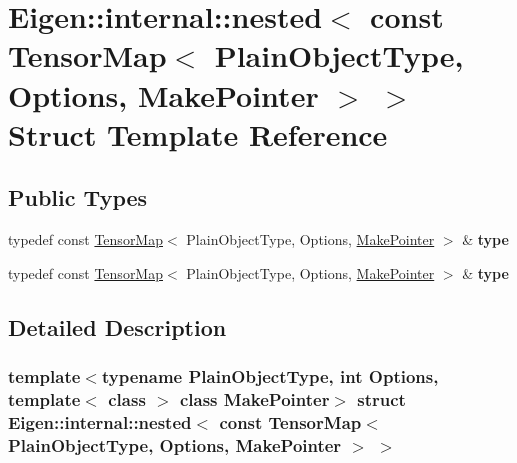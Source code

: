 \hypertarget{struct_eigen_1_1internal_1_1nested_3_01const_01_tensor_map_3_01_plain_object_type_00_01_options_00_01_make_pointer_01_4_01_4}{}\section{Eigen\+:\+:internal\+:\+:nested$<$ const Tensor\+Map$<$ Plain\+Object\+Type, Options, Make\+Pointer $>$ $>$ Struct Template Reference}
\label{struct_eigen_1_1internal_1_1nested_3_01const_01_tensor_map_3_01_plain_object_type_00_01_options_00_01_make_pointer_01_4_01_4}
\subsection*{Public Types}
\begin{DoxyCompactItemize}
\item 
\mbox{\label{struct_eigen_1_1internal_1_1nested_3_01const_01_tensor_map_3_01_plain_object_type_00_01_options_00_01_make_pointer_01_4_01_4_aed5a6f72f62f38006cb2ff3a37c3d5f2}} 
typedef const \hyperlink{class_eigen_1_1_tensor_map}{Tensor\+Map}$<$ Plain\+Object\+Type, Options, \hyperlink{struct_eigen_1_1_make_pointer}{Make\+Pointer} $>$ \& {\bfseries type}
\item 
\mbox{\label{struct_eigen_1_1internal_1_1nested_3_01const_01_tensor_map_3_01_plain_object_type_00_01_options_00_01_make_pointer_01_4_01_4_aed5a6f72f62f38006cb2ff3a37c3d5f2}} 
typedef const \hyperlink{class_eigen_1_1_tensor_map}{Tensor\+Map}$<$ Plain\+Object\+Type, Options, \hyperlink{struct_eigen_1_1_make_pointer}{Make\+Pointer} $>$ \& {\bfseries type}
\end{DoxyCompactItemize}


\subsection{Detailed Description}
\subsubsection*{template$<$typename Plain\+Object\+Type, int Options, template$<$ class $>$ class Make\+Pointer$>$\newline
struct Eigen\+::internal\+::nested$<$ const Tensor\+Map$<$ Plain\+Object\+Type, Options, Make\+Pointer $>$ $>$}



